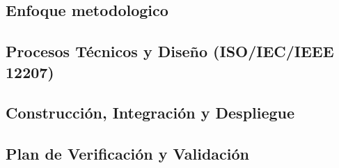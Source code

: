 \subsection{Enfoque metodologico}


\subsection{Procesos Técnicos y Diseño (ISO/IEC/IEEE 12207)}


\subsection{Construcción, Integración y Despliegue}


\subsection{Plan de Verificación y Validación}

